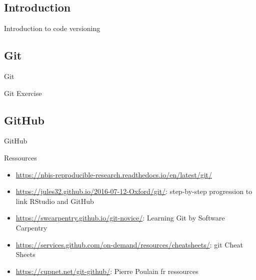 \subsection{Introduction}
\begin{frame}{}
    \huge{Introduction to code versioning}
\end{frame}


\subsection{Git}
\begin{frame}{}
    \huge{Git}
\end{frame}

\begin{frame}{}
    \huge{Git Exercise}
\end{frame}



\subsection{GitHub}
\begin{frame}{}
    \huge{GitHub}
\end{frame}

%
%


\begin{frame}{Ressources}
\begin{itemize}
    \item \url{https://nbis-reproducible-research.readthedocs.io/en/latest/git/}
    \item \url{https://jules32.github.io/2016-07-12-Oxford/git/}: step-by-step progression to link RStudio and GitHub
    \item \url{https://swcarpentry.github.io/git-novice/}: Learning Git by Software Carpentry 
    \item \url{https://services.github.com/on-demand/resources/cheatsheets/}: git Cheat Sheets
    \item \url{https://cupnet.net/git-github/}: Pierre Poulain fr ressources
\end{itemize}
\end{frame}